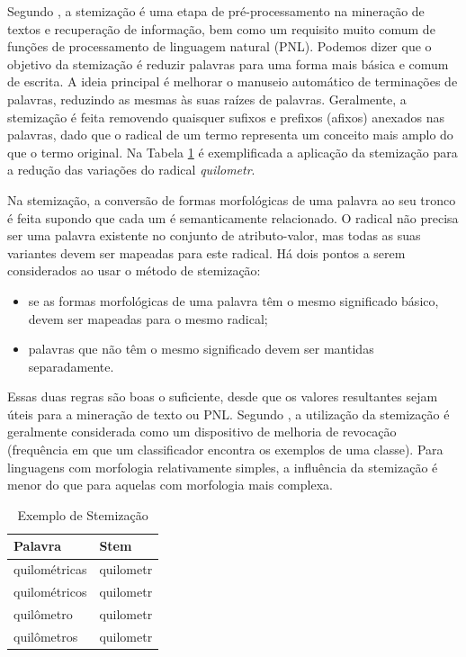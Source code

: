 Segundo \cite{jivani2011comparative}, a stemização é uma etapa de pré-processamento na mineração de textos e recuperação de informação,  bem como um requisito muito comum de funções de processamento de linguagem natural (PNL). Podemos dizer que o objetivo da stemização é reduzir palavras para uma forma mais básica e comum de escrita. A ideia principal é melhorar o manuseio automático de terminações de palavras, reduzindo as mesmas às suas raízes de palavras. Geralmente, a stemização é feita removendo quaisquer sufixos e prefixos (afixos) anexados nas palavras, dado que o radical de um termo representa um conceito mais amplo do que o termo original. Na Tabela \ref{tab:exemplo-stem} é exemplificada a aplicação da stemização para a redução das variações do radical \textit{quilometr}.

Na stemização, a conversão de formas morfológicas de uma palavra ao seu tronco é feita supondo que cada um é semanticamente relacionado. O radical não precisa ser uma palavra existente no conjunto de atributo-valor, mas todas as suas variantes devem ser mapeadas para este radical. Há dois pontos a serem considerados ao usar o método de stemização:

\begin{itemize}
    \item se as formas morfológicas de uma palavra têm o mesmo significado básico, devem ser mapeadas para o mesmo radical;

    \item palavras que não têm o mesmo significado devem ser mantidas separadamente.
\end{itemize}

Essas duas regras são boas o suficiente, desde que os valores resultantes sejam úteis para a mineração de texto ou PNL. Segundo \cite{jivani2011comparative}, a utilização da stemização é geralmente considerada como um dispositivo de melhoria de revocação (frequência em que um classificador encontra os exemplos de uma classe). Para linguagens com morfologia relativamente simples, a influência da stemização é menor do que para aquelas com morfologia mais complexa.

\begin{table}[h]
    \centering
    {\renewcommand \arraystretch{1.25}
        \begin{tabular}{ l | l }
            \hline  
            \textbf{Palavra} & \textbf{Stem} \\  
            \hline
            quilométricas & quilometr \\  
            quilométricos & quilometr \\  
            quilômetro & quilometr \\  
            quilômetros & quilometr \\  
            \hline
        \end{tabular} 
    }
    \caption{Exemplo de Stemização}\label{tab:exemplo-stem}
\end{table}

